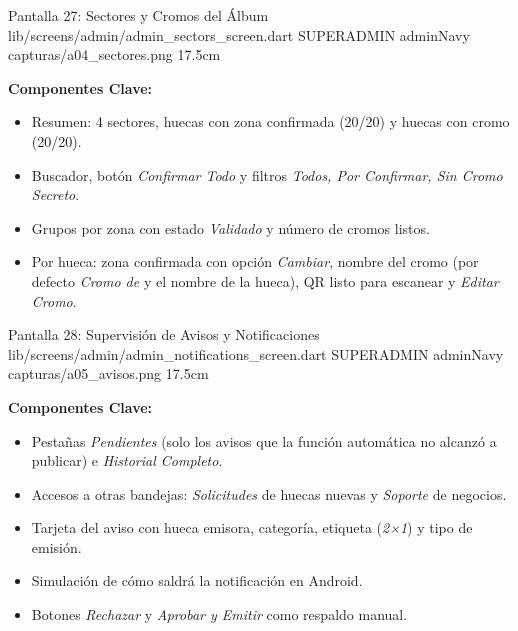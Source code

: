 \pantallashowcase
  {Pantalla 27: Sectores y Cromos del Álbum}
  {lib/screens/admin/admin_sectors_screen.dart}
  {SUPERADMIN}
  {adminNavy}
  {capturas/a04_sectores.png}
  {17.5cm}
  {

    \textbf{Componentes Clave:}
    \begin{itemize}[leftmargin=*, itemsep=2pt]
      \item Resumen: 4 sectores, huecas con zona confirmada (20/20) y huecas con cromo (20/20).
      \item Buscador, botón \textit{Confirmar Todo} y filtros \textit{Todos, Por Confirmar, Sin Cromo Secreto}.
      \item Grupos por zona con estado \textit{Validado} y número de cromos listos.
      \item Por hueca: zona confirmada con opción \textit{Cambiar}, nombre del cromo (por defecto \textit{Cromo de} y el nombre de la hueca), QR listo para escanear y \textit{Editar Cromo}.
    \end{itemize}
  }

\pantallashowcase
  {Pantalla 28: Supervisión de Avisos y Notificaciones}
  {lib/screens/admin/admin_notifications_screen.dart}
  {SUPERADMIN}
  {adminNavy}
  {capturas/a05_avisos.png}
  {17.5cm}
  {

    \textbf{Componentes Clave:}
    \begin{itemize}[leftmargin=*, itemsep=2pt]
      \item Pestañas \textit{Pendientes} (solo los avisos que la función automática no alcanzó a publicar) e \textit{Historial Completo}.
      \item Accesos a otras bandejas: \textit{Solicitudes} de huecas nuevas y \textit{Soporte} de negocios.
      \item Tarjeta del aviso con hueca emisora, categoría, etiqueta (\textit{2×1}) y tipo de emisión.
      \item Simulación de cómo saldrá la notificación en Android.
      \item Botones \textit{Rechazar} y \textit{Aprobar y Emitir} como respaldo manual.
    \end{itemize}
  }

